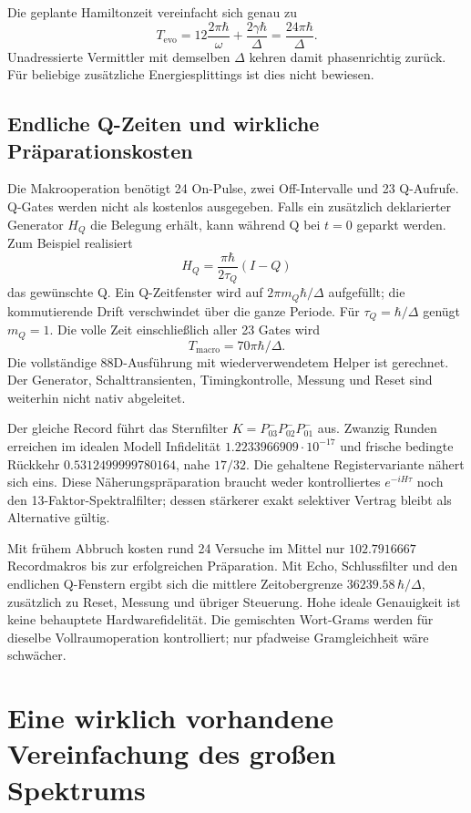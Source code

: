 Die geplante Hamiltonzeit vereinfacht sich genau zu
\[
T_\mathrm{evo}=12\frac{2\pi\hbar}{\omega}+\frac{2\gamma\hbar}{\Delta}
=\frac{24\pi\hbar}{\Delta}.
\]
Unadressierte Vermittler mit demselben $\Delta$ kehren damit phasenrichtig zurück. Für beliebige zusätzliche Energiesplittings ist dies nicht bewiesen.

\section{Endliche Q-Zeiten und wirkliche Präparationskosten}
Die Makrooperation benötigt 24 On-Pulse, zwei Off-Intervalle und 23 Q-Aufrufe. Q-Gates werden nicht als kostenlos ausgegeben. Falls ein zusätzlich deklarierter Generator $H_Q$ die Belegung erhält, kann während Q bei $t=0$ geparkt werden. Zum Beispiel realisiert
\[
H_Q=\frac{\pi\hbar}{2\tau_Q}(I-Q)
\]
das gewünschte Q. Ein Q-Zeitfenster wird auf $2\pi m_Q\hbar/\Delta$ aufgefüllt; die kommutierende Drift verschwindet über die ganze Periode. Für $\tau_Q=\hbar/\Delta$ genügt $m_Q=1$. Die volle Zeit einschließlich aller 23 Gates wird
\[
T_\mathrm{macro}=70\pi\hbar/\Delta.
\]
Die vollständige 88D-Ausführung mit wiederverwendetem Helper ist gerechnet. Der Generator, Schalttransienten, Timingkontrolle, Messung und Reset sind weiterhin nicht nativ abgeleitet.

Der gleiche Record führt das Sternfilter $K=P^-_{03}P^-_{02}P^-_{01}$ aus. Zwanzig Runden erreichen im idealen Modell Infidelität $1.2233966909\cdot10^{-17}$ und frische bedingte Rückkehr $0.5312499999780164$, nahe $17/32$. Die gehaltene Registervariante nähert sich eins. Diese Näherungspräparation braucht weder kontrolliertes $e^{-iH\tau}$ noch den 13-Faktor-Spektralfilter; dessen stärkerer exakt selektiver Vertrag bleibt als Alternative gültig.

Mit frühem Abbruch kosten rund 24 Versuche im Mittel nur $102.7916667$ Recordmakros bis zur erfolgreichen Präparation. Mit Echo, Schlussfilter und den endlichen Q-Fenstern ergibt sich die mittlere Zeitobergrenze $36239.58\,\hbar/\Delta$, zusätzlich zu Reset, Messung und übriger Steuerung. Hohe ideale Genauigkeit ist keine behauptete Hardwarefidelität. Die gemischten Wort-Grams werden für dieselbe Vollraumoperation kontrolliert; nur pfadweise Gramgleichheit wäre schwächer.

\chapter{Eine wirklich vorhandene Vereinfachung des großen Spektrums}
\label{ch:spectrum15}
